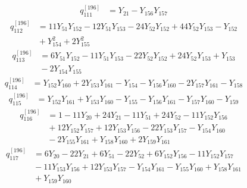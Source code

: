 \begin{equation}\label{q196:row:111}
\begin{aligned}
q_{111}^{[196]} &={} Y_{21} - Y_{156}Y_{157}
\end{aligned}
\end{equation}
\begin{equation}\label{q196:row:112}
\begin{aligned}
q_{112}^{[196]} &={} 11Y_{51}Y_{152} - 12Y_{51}Y_{153} - 24Y_{52}Y_{152} + 44Y_{52}Y_{153} - Y_{152}\\
&{} + Y_{154}^{2} + 2Y_{155}^{2}
\end{aligned}
\end{equation}
\begin{equation}\label{q196:row:113}
\begin{aligned}
q_{113}^{[196]} &={} 6Y_{51}Y_{152} - 11Y_{51}Y_{153} - 22Y_{52}Y_{152} + 24Y_{52}Y_{153} + Y_{153}\\
&{} - 2Y_{154}Y_{155}
\end{aligned}
\end{equation}
\begin{equation}\label{q196:row:114}
\begin{aligned}
q_{114}^{[196]} &={} Y_{152}Y_{160} + 2Y_{153}Y_{161} - Y_{154} - Y_{156}Y_{160} - 2Y_{157}Y_{161} - Y_{158}
\end{aligned}
\end{equation}
\begin{equation}\label{q196:row:115}
\begin{aligned}
q_{115}^{[196]} &={} Y_{152}Y_{161} + Y_{153}Y_{160} - Y_{155} - Y_{156}Y_{161} - Y_{157}Y_{160} - Y_{159}
\end{aligned}
\end{equation}
\begin{equation}\label{q196:row:116}
\begin{aligned}
q_{116}^{[196]} &={} 1 - 11Y_{20} + 24Y_{21} - 11Y_{51} + 24Y_{52} - 11Y_{152}Y_{156}\\
&{} + 12Y_{152}Y_{157} + 12Y_{153}Y_{156} - 22Y_{153}Y_{157} - Y_{154}Y_{160}\\
&{} - 2Y_{155}Y_{161} + Y_{158}Y_{160} + 2Y_{159}Y_{161}
\end{aligned}
\end{equation}
\begin{equation}\label{q196:row:117}
\begin{aligned}
q_{117}^{[196]} &={} 6Y_{20} - 22Y_{21} + 6Y_{51} - 22Y_{52} + 6Y_{152}Y_{156} - 11Y_{152}Y_{157}\\
&{} - 11Y_{153}Y_{156} + 12Y_{153}Y_{157} - Y_{154}Y_{161} - Y_{155}Y_{160} + Y_{158}Y_{161}\\
&{} + Y_{159}Y_{160}
\end{aligned}
\end{equation}
